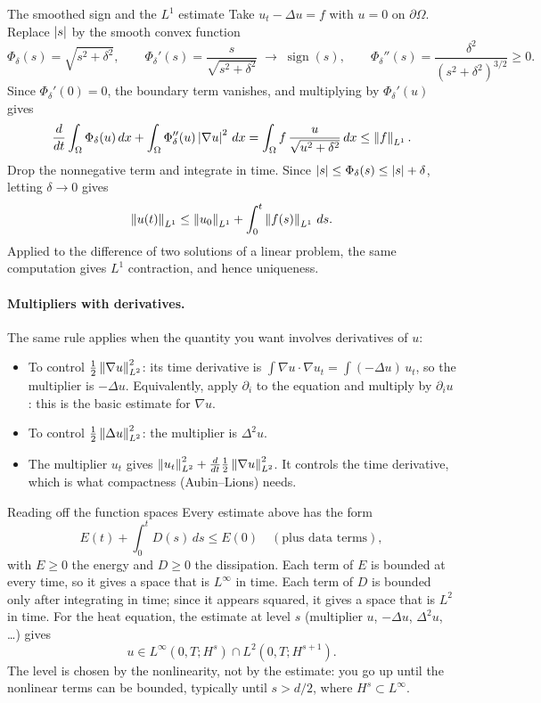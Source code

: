 \begin{exbox}{The smoothed sign and the $L^1$ estimate}
Take $u_t-\Delta u=f$ with $u=0$ on $\partial\Omega$. Replace $\left\lvert s\right\rvert$ by the smooth convex function
\[
\Phi_\delta(s)=\sqrt{s^2+\delta^2},\qquad
\Phi_\delta'(s)=\frac{s}{\sqrt{s^2+\delta^2}}\;\longrightarrow\;\operatorname{sign}(s),\qquad
\Phi_\delta''(s)=\frac{\delta^2}{(s^2+\delta^2)^{3/2}}\ge 0 .
\]
Since $\Phi_\delta'(0)=0$, the boundary term vanishes, and multiplying by $\Phi_\delta'(u)$ gives
\[
\frac{d}{dt}\int_\Omega \Phi_\delta(u)\,dx+\int_\Omega \Phi_\delta''(u)\left\lvert \nabla u\right\rvert^2\,dx=\int_\Omega f\,\frac{u}{\sqrt{u^2+\delta^2}}\,dx\le \left\lVert f\right\rVert_{L^1}.
\]
Drop the nonnegative term and integrate in time. Since $\left\lvert s\right\rvert\le\Phi_\delta(s)\le\left\lvert s\right\rvert+\delta$, letting $\delta\to 0$ gives
\[
\left\lVert u(t)\right\rVert_{L^1}\le \left\lVert u_0\right\rVert_{L^1}+\int_0^t\left\lVert f(s)\right\rVert_{L^1}\,ds .
\]
Applied to the difference of two solutions of a linear problem, the same computation gives $L^1$ contraction, and hence uniqueness.
\end{exbox}

\paragraph{Multipliers with derivatives.} The same rule applies when the quantity you want involves derivatives of $u$:
\begin{itemize}
\item To control $\frac12\left\lVert \nabla u\right\rVert_{L^2}^2$: its time derivative is $\int\nabla u\cdot\nabla u_t=\int(-\Delta u)\,u_t$, so the multiplier is $-\Delta u$. Equivalently, apply $\partial_i$ to the equation and multiply by $\partial_i u$: this is the basic estimate for $\nabla u$.
\item To control $\frac12\left\lVert \Delta u\right\rVert_{L^2}^2$: the multiplier is $\Delta^2 u$.
\item The multiplier $u_t$ gives $\left\lVert u_t\right\rVert_{L^2}^2+\frac{d}{dt}\frac12\left\lVert \nabla u\right\rVert_{L^2}^2$. It controls the time derivative, which is what compactness (Aubin--Lions) needs.
\end{itemize}

\begin{rmkbox}{Reading off the function spaces}
Every estimate above has the form
\[
E(t)+\int_0^t D(s)\,ds\le E(0)\quad(\text{plus data terms}),
\]
with $E\ge 0$ the energy and $D\ge 0$ the dissipation. Each term of $E$ is bounded at every time, so it gives a space that is $L^\infty$ in time. Each term of $D$ is bounded only after integrating in time; since it appears squared, it gives a space that is $L^2$ in time. For the heat equation, the estimate at level $s$ (multiplier $u$, $-\Delta u$, $\Delta^2u$, \dots) gives
\[
u\in L^\infty(0,T;H^s)\cap L^2(0,T;H^{s+1}).
\]
The level is chosen by the nonlinearity, not by the estimate: you go up until the nonlinear terms can be bounded, typically until $s>d/2$, where $H^s\subset L^\infty$.
\end{rmkbox}


